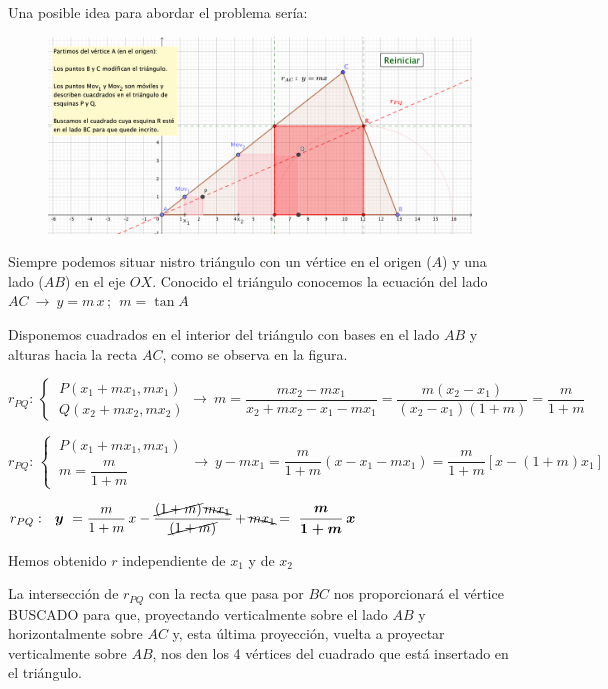 Una posible idea para abordar el problema sería:

\begin{figure}[H]
	\centering
	\includegraphics[width=1\textwidth]{img-ga/cuadradoentriangulo.png}
\end{figure}

Siempre podemos situar nistro triángulo con un vértice en el origen ($A$) y una lado ($AB$) en el eje $OX$. Conocido el triángulo conocemos la ecuación del lado $AC \ \to \ y=m\, x \, ; \ \ m=\tan A$

Disponemos cuadrados en el interior del triángulo con bases en el lado $AB$ y alturas hacia la recta $AC$, como se observa en la figura.

$r_{PQ}:\, \begin{cases} \ P(x_1+mx_1,mx_1) \\ \ Q(x_2+mx_2,mx_2) \end{cases} \to \ m=\dfrac{mx_2-mx_1}{x_2+mx_2-x_1-mx_1}=\dfrac{m(x_2-x_1)}{(x_2-x_1)(1+m)}=\dfrac{m}{1+m}$

$r_{PQ}:\, \begin{cases} \ P(x_1+mx_1,mx_1) \\ \ m=\dfrac{m}{1+m} \end{cases} \ \to \ y-mx_1=\dfrac{m}{1+m}(x-x_1-mx_1)=\dfrac{m}{1+m}[x-(1+m)x_1] $

$r_{PQ}:\ \ \boldsymbol{ y} \ =\dfrac{m}{1+m}\, x- 
\dfrac{\cancel{(1+m)}\,\bcancel{ mx_1} }{\cancel{(1+m)}} 
+ \bcancel{mx_1}
=\ \boldsymbol{ \dfrac{m}{1+m}\, x}$

\vspace{5mm} Hemos obtenido $r$  independiente de  $x_1$  y de $x_2$

La intersección de  $r_{PQ}$ con la recta que pasa por $BC$ nos proporcionará el vértice BUSCADO para que, proyectando verticalmente sobre el lado $AB$ y horizontalmente sobre $AC$ y, esta última proyección, vuelta a proyectar verticalmente sobre $AB$, nos den los 4 vértices del cuadrado que está insertado en el triángulo.



